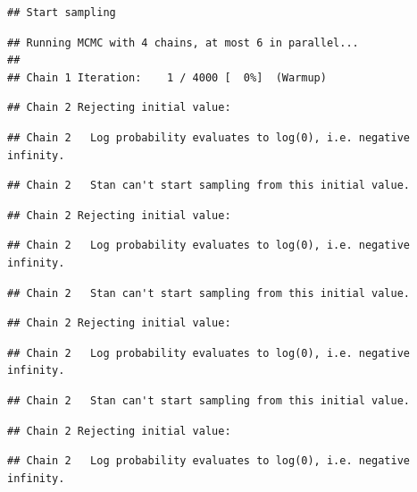\documentclass[
]{article}
\begin{document}
\begin{verbatim}
## Start sampling
\end{verbatim}

\begin{verbatim}
## Running MCMC with 4 chains, at most 6 in parallel...
## 
## Chain 1 Iteration:    1 / 4000 [  0%]  (Warmup)
\end{verbatim}

\begin{verbatim}
## Chain 2 Rejecting initial value:
\end{verbatim}

\begin{verbatim}
## Chain 2   Log probability evaluates to log(0), i.e. negative infinity.
\end{verbatim}

\begin{verbatim}
## Chain 2   Stan can't start sampling from this initial value.
\end{verbatim}

\begin{verbatim}
## Chain 2 Rejecting initial value:
\end{verbatim}

\begin{verbatim}
## Chain 2   Log probability evaluates to log(0), i.e. negative infinity.
\end{verbatim}

\begin{verbatim}
## Chain 2   Stan can't start sampling from this initial value.
\end{verbatim}

\begin{verbatim}
## Chain 2 Rejecting initial value:
\end{verbatim}

\begin{verbatim}
## Chain 2   Log probability evaluates to log(0), i.e. negative infinity.
\end{verbatim}

\begin{verbatim}
## Chain 2   Stan can't start sampling from this initial value.
\end{verbatim}

\begin{verbatim}
## Chain 2 Rejecting initial value:
\end{verbatim}

\begin{verbatim}
## Chain 2   Log probability evaluates to log(0), i.e. negative infinity.
\end{verbatim}
\end{document}
